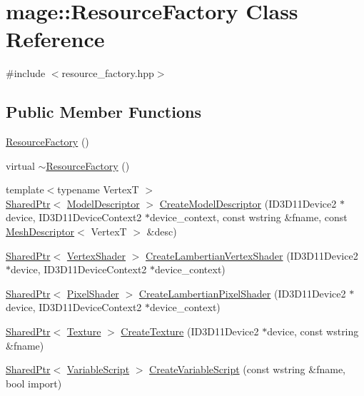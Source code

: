 \hypertarget{classmage_1_1_resource_factory}{}\section{mage\+:\+:Resource\+Factory Class Reference}
\label{classmage_1_1_resource_factory}


{\ttfamily \#include $<$resource\+\_\+factory.\+hpp$>$}

\subsection*{Public Member Functions}
\begin{DoxyCompactItemize}
\item 
\hyperlink{classmage_1_1_resource_factory_a340bde81096427e319b60063ae771a0d}{Resource\+Factory} ()
\item 
virtual \hyperlink{classmage_1_1_resource_factory_a58764dea5d6cd05405bd62366cc25681}{$\sim$\+Resource\+Factory} ()
\item 
{\footnotesize template$<$typename VertexT $>$ }\\\hyperlink{namespacemage_a1e01ae66713838a7a67d30e44c67703e}{Shared\+Ptr}$<$ \hyperlink{classmage_1_1_model_descriptor}{Model\+Descriptor} $>$ \hyperlink{classmage_1_1_resource_factory_ae27d9c780713784afcd02726ce959b8c}{Create\+Model\+Descriptor} (I\+D3\+D11\+Device2 $\ast$device, I\+D3\+D11\+Device\+Context2 $\ast$device\+\_\+context, const wstring \&fname, const \hyperlink{structmage_1_1_mesh_descriptor}{Mesh\+Descriptor}$<$ VertexT $>$ \&desc)
\item 
\hyperlink{namespacemage_a1e01ae66713838a7a67d30e44c67703e}{Shared\+Ptr}$<$ \hyperlink{classmage_1_1_vertex_shader}{Vertex\+Shader} $>$ \hyperlink{classmage_1_1_resource_factory_a2cb9e994452637df64991f48b52e84a6}{Create\+Lambertian\+Vertex\+Shader} (I\+D3\+D11\+Device2 $\ast$device, I\+D3\+D11\+Device\+Context2 $\ast$device\+\_\+context)
\item 
\hyperlink{namespacemage_a1e01ae66713838a7a67d30e44c67703e}{Shared\+Ptr}$<$ \hyperlink{classmage_1_1_pixel_shader}{Pixel\+Shader} $>$ \hyperlink{classmage_1_1_resource_factory_a5df89f6980eee2e982e606549daf087f}{Create\+Lambertian\+Pixel\+Shader} (I\+D3\+D11\+Device2 $\ast$device, I\+D3\+D11\+Device\+Context2 $\ast$device\+\_\+context)
\item 
\hyperlink{namespacemage_a1e01ae66713838a7a67d30e44c67703e}{Shared\+Ptr}$<$ \hyperlink{classmage_1_1_texture}{Texture} $>$ \hyperlink{classmage_1_1_resource_factory_ab7f2069f6baf97fb158bf45a76e0a657}{Create\+Texture} (I\+D3\+D11\+Device2 $\ast$device, const wstring \&fname)
\item 
\hyperlink{namespacemage_a1e01ae66713838a7a67d30e44c67703e}{Shared\+Ptr}$<$ \hyperlink{classmage_1_1_variable_script}{Variable\+Script} $>$ \hyperlink{classmage_1_1_resource_factory_a523e3f76a3d8347f6d75a7b87a291b1e}{Create\+Variable\+Script} (const wstring \&fname, bool import)
\end{DoxyCompactItemize}
